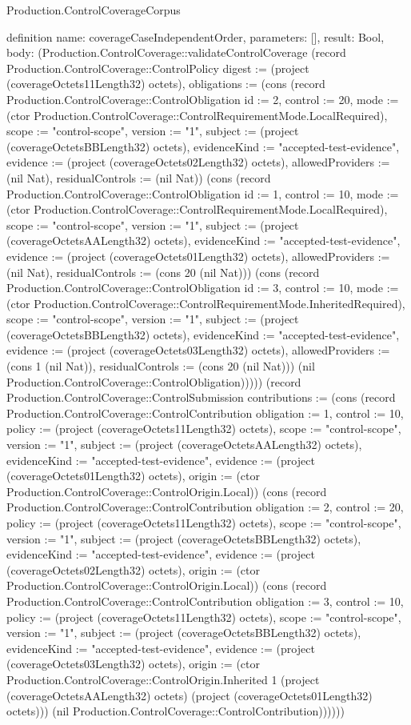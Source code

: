 \begin{lexlean}{Production.ControlCoverageCorpus}
\begin{semanticmodule}
definition{
  name: coverageCaseIndependentOrder,
  parameters: [],
  result: Bool,
  body: (Production.ControlCoverage::validateControlCoverage (record Production.ControlCoverage::ControlPolicy {digest := (project (coverageOctets11Length32) octets), obligations := (cons (record Production.ControlCoverage::ControlObligation {id := 2, control := 20, mode := (ctor Production.ControlCoverage::ControlRequirementMode.LocalRequired), scope := "control-scope", version := "1", subject := (project (coverageOctetsBBLength32) octets), evidenceKind := "accepted-test-evidence", evidence := (project (coverageOctets02Length32) octets), allowedProviders := (nil Nat), residualControls := (nil Nat)}) (cons (record Production.ControlCoverage::ControlObligation {id := 1, control := 10, mode := (ctor Production.ControlCoverage::ControlRequirementMode.LocalRequired), scope := "control-scope", version := "1", subject := (project (coverageOctetsAALength32) octets), evidenceKind := "accepted-test-evidence", evidence := (project (coverageOctets01Length32) octets), allowedProviders := (nil Nat), residualControls := (cons 20 (nil Nat))}) (cons (record Production.ControlCoverage::ControlObligation {id := 3, control := 10, mode := (ctor Production.ControlCoverage::ControlRequirementMode.InheritedRequired), scope := "control-scope", version := "1", subject := (project (coverageOctetsBBLength32) octets), evidenceKind := "accepted-test-evidence", evidence := (project (coverageOctets03Length32) octets), allowedProviders := (cons 1 (nil Nat)), residualControls := (cons 20 (nil Nat))}) (nil Production.ControlCoverage::ControlObligation))))}) (record Production.ControlCoverage::ControlSubmission {contributions := (cons (record Production.ControlCoverage::ControlContribution {obligation := 1, control := 10, policy := (project (coverageOctets11Length32) octets), scope := "control-scope", version := "1", subject := (project (coverageOctetsAALength32) octets), evidenceKind := "accepted-test-evidence", evidence := (project (coverageOctets01Length32) octets), origin := (ctor Production.ControlCoverage::ControlOrigin.Local)}) (cons (record Production.ControlCoverage::ControlContribution {obligation := 2, control := 20, policy := (project (coverageOctets11Length32) octets), scope := "control-scope", version := "1", subject := (project (coverageOctetsBBLength32) octets), evidenceKind := "accepted-test-evidence", evidence := (project (coverageOctets02Length32) octets), origin := (ctor Production.ControlCoverage::ControlOrigin.Local)}) (cons (record Production.ControlCoverage::ControlContribution {obligation := 3, control := 10, policy := (project (coverageOctets11Length32) octets), scope := "control-scope", version := "1", subject := (project (coverageOctetsBBLength32) octets), evidenceKind := "accepted-test-evidence", evidence := (project (coverageOctets03Length32) octets), origin := (ctor Production.ControlCoverage::ControlOrigin.Inherited 1 (project (coverageOctetsAALength32) octets) (project (coverageOctets01Length32) octets))}) (nil Production.ControlCoverage::ControlContribution))))}))
}


\end{semanticmodule}
\end{lexlean}
